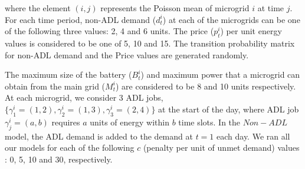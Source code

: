 where the element $(i,j)$ represents the Poisson mean of microgrid $i$ at time $j$.
For each time period, non-ADL demand ($d_t^i$) at each of the microgrids can be one of the following  three values: 2, 4 and 6 units. The price ($p_t^i$) per unit energy values is considered to be one of 5, 10 and 15. 
The transition probability matrix for non-ADL demand and the Price values are generated randomly.

%
The maximum size of the battery ($B_t^i$) and maximum power that a microgrid can obtain from the main grid ($M_t^i$) are considered to be 8 and 10 units respectively.
At each microgrid, we consider 3 ADL jobs, $\{\gamma_{1}^{i} =  (1,2), \gamma_{2}^{i} =  (1,3),  \gamma_{3}^{i} =  (2,4)\}$ at the start of the day, where ADL job $\gamma_{j}^{i} =  (a,b)$ requires $a$ units of energy within $b$ time slots. In the $Non-ADL$ model, the ADL demand is added to the demand at $t = 1$ each day. %
We ran all our models for each of the following $c$ (penalty per unit of unmet demand) values : 0, 5, 10 and 30, respectively.
